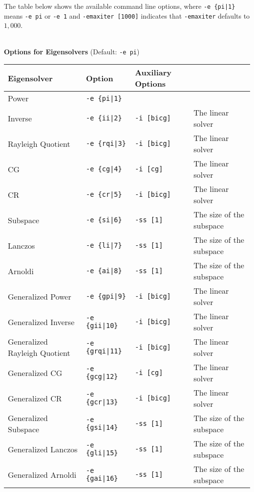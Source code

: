 \documentclass[a4paper]{article}
\begin{document}
The table below shows the available command line options, 
where \verb=-e {pi|1}= means \verb=-e pi= or \verb=-e 1= and \verb=-emaxiter [1000]= indicates 
that \verb=-emaxiter= defaults to $1,000$.
\\
\\
\begin{minipage}[t]{\textwidth}
\begin{center}
{\bf Options for Eigensolvers} (Default: \verb=-e pi=) \\
\begin{tabular}{l|lll}\hline\hline
 Eigensolver      & Option              &  Auxiliary Options  & \\ \hline
\hline
 Power                             & \verb=-e {pi|1}=        &    \\ 
 Inverse                           & \verb=-e {ii|2}=        & 
 \verb=-i [bicg]= & The linear solver \\
 Rayleigh Quotient                 & \verb=-e {rqi|3}=       &
 \verb=-i [bicg]= & The linear solver \\
 CG                                & \verb=-e {cg|4}=        &
 \verb=-i [cg]= & The linear solver \\ 
 CR                                & \verb=-e {cr|5}=        &
 \verb=-i [bicg]= & The linear solver \\ 
 Subspace                          & \verb=-e {si|6}=        &
 \verb=-ss [1]= & The size of the subspace \\
 Lanczos                           & \verb=-e {li|7}=        &
 \verb=-ss [1]= & The size of the subspace \\
 Arnoldi                           & \verb=-e {ai|8}=        &
 \verb=-ss [1]= & The size of the subspace \\
 Generalized Power                 & \verb=-e {gpi|9}=      &
 \verb=-i [bicg]= & The linear solver \\ 
 Generalized Inverse               & \verb=-e {gii|10}=      & 
 \verb=-i [bicg]= & The linear solver \\
 Generalized Rayleigh Quotient     & \verb=-e {grqi|11}=      & 
 \verb=-i [bicg]= & The linear solver \\ 
 Generalized CG                    & \verb=-e {gcg|12}=      & 
 \verb=-i [cg]= & The linear solver \\
 Generalized CR                    & \verb=-e {gcr|13}=      & 
 \verb=-i [bicg]= & The linear solver \\
 Generalized Subspace              & \verb=-e {gsi|14}=      &
 \verb=-ss [1]= & The size of the subspace \\
 Generalized Lanczos               & \verb=-e {gli|15}=      &
 \verb=-ss [1]= & The size of the subspace \\
 Generalized Arnoldi               & \verb=-e {gai|16}=      &
 \verb=-ss [1]= & The size of the subspace \\  
\hline         
\end{tabular}
\end{center}
\end{minipage}
\end{document}
